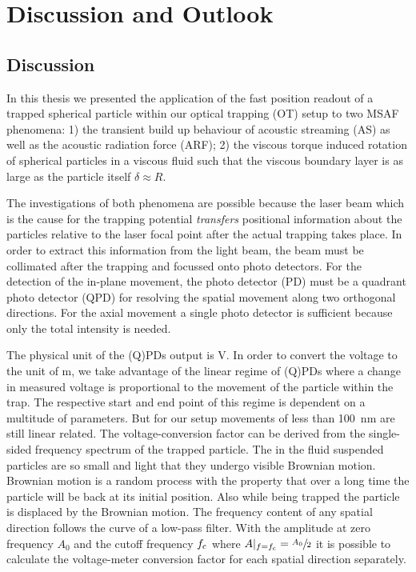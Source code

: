 \chapter[Discussion \& Outlook]{Discussion and Outlook}\label{ch:discussion}

\section{Discussion}
In this thesis we presented the application of the fast position readout of a 
trapped spherical particle within our optical trapping (OT) setup to two MSAF 
phenomena: 1) the transient build up behaviour of acoustic streaming (AS) as 
well as the acoustic radiation force (ARF); 2) the viscous torque induced 
rotation of spherical particles in a viscous fluid such that the viscous 
boundary layer is as large as the particle itself $\delta \approx R$.

The investigations of both phenomena are possible because the laser beam which 
is the cause for the trapping potential \emph{transfers} positional information 
about the particles relative to the laser focal point after the actual trapping 
takes place. In order to extract this information from the light beam, the beam 
must be collimated after the trapping and focussed onto photo detectors. For 
the detection of the in-plane movement, the photo detector (PD) must be a 
quadrant photo detector (QPD) for resolving the spatial movement along two 
orthogonal directions. For the axial movement a single photo detector is 
sufficient because only the total intensity is needed.

The physical unit of the (Q)PDs output is \si{\volt}. In order to convert the 
voltage to the unit of \si{\meter}, we take advantage of the linear regime of 
(Q)PDs where a change in measured voltage is proportional to the movement of 
the particle within the trap. The respective start and end point of this 
regime is dependent on a multitude of parameters. But for our setup movements 
of less than \SI{100}{\nm} are still linear related. The voltage-conversion 
factor can be derived from the single-sided frequency spectrum of the trapped 
particle. The in the fluid suspended particles are so small and light that they 
undergo visible Brownian motion. Brownian motion is a random process with the 
property that over a long time the particle will be back at its initial 
position. Also while being trapped the particle is displaced by the Brownian 
motion. The frequency content of any spatial direction follows the curve of a 
low-pass filter. With the amplitude at zero frequency $A_{0}$ and the cutoff 
frequency $f_{\mathrm{c}}$ where $A\vert_{f=f_{\mathrm{c}}}=\sfrac{A_{0}}{2}$ it is 
possible to calculate the voltage-meter conversion factor for each spatial 
direction separately.

